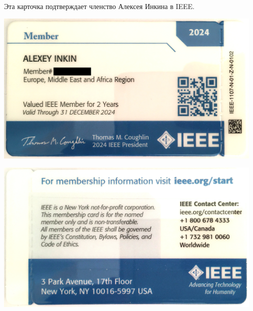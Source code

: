 
Эта карточка подтверждает членство Алексея Инкина в IEEE.


\includegraphics[width=35em]{member-card-front}

\includegraphics[width=35em]{member-card-back}

\pagebreak
